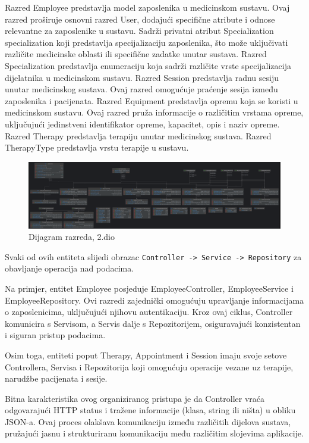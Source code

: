 Razred Employee predstavlja model zaposlenika u medicinskom sustavu. Ovaj razred proširuje osnovni razred User, dodajući specifične atribute i odnose relevantne za zaposlenike u sustavu. Sadrži privatni  atribut Specialization specialization koji predstavlja specijalizaciju zaposlenika, što može uključivati različite medicinske oblasti ili specifične zadatke unutar sustava. \newline
Razred Specialization predstavlja enumeraciju koja sadrži različite vrste specijalizacija dijelatnika u medicinskom sustavu. 
Razred Session predstavlja radnu sesiju unutar medicinskog sustava. Ovaj razred omogućuje praćenje sesija između zaposlenika i pacijenata. 
Razred Equipment predstavlja opremu koja se koristi u medicinskom sustavu. Ovaj razred pruža informacije o različitim vrstama opreme, uključujući jedinstveni identifikator opreme, kapacitet, opis i naziv opreme. 
Razred Therapy predstavlja terapiju unutar medicinskog sustava. 
 Razred TherapyType predstavlja vrstu terapije u sustavu.

   \begin{figure}[H]
    \centering
    \includegraphics[width=1\linewidth]{slike/razredi2.png}
    \caption{Dijagram razreda, 2.dio}
    \label{fig:enter-label}
\end{figure}


Svaki od ovih entiteta slijedi obrazac \verb|Controller -> Service -> Repository| za obavljanje operacija nad podacima.

Na primjer, entitet Employee posjeduje EmployeeController, EmployeeService i EmployeeRepository. Ovi razredi zajednički omogućuju upravljanje informacijama o zaposlenicima, uključujući njihovu autentikaciju. Kroz ovaj ciklus, Controller komunicira s Servisom, a Servis dalje s Repozitorijem, osiguravajući konzistentan i siguran pristup podacima.

Osim toga, entiteti poput Therapy, Appointment i Session imaju svoje setove Controllera, Servisa i Repozitorija koji omogućuju operacije vezane uz terapije, narudžbe pacijenata i sesije.

Bitna karakteristika ovog organiziranog pristupa je da Controller vraća odgovarajući HTTP status i tražene informacije (klasa, string ili ništa) u obliku JSON-a. Ovaj proces olakšava komunikaciju između različitih dijelova sustava, pružajući jasnu i strukturiranu komunikaciju među različitim slojevima aplikacije.

